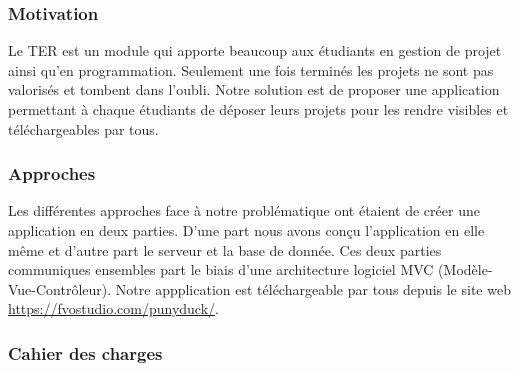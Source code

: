 \documentclass{report}
\begin{document}
\subsubsection{\huge{Motivation}}

Le TER est un module qui apporte beaucoup aux étudiants en gestion de projet ainsi qu'en programmation. Seulement une fois terminés les projets ne sont pas valorisés et tombent dans l'oubli. Notre solution est de proposer une application permettant à chaque étudiants de déposer leurs projets pour les rendre visibles et téléchargeables par tous.

\subsubsection{\huge{Approches}}
Les différentes approches face à notre problématique ont étaient de créer une application en deux parties. D'une part nous avons conçu l'application en elle même et d'autre part le serveur et la base de donnée. Ces deux parties communiques ensembles part le biais d'une architecture logiciel MVC (Modèle-Vue-Contrôleur).
Notre appplication est téléchargeable par tous depuis le site web \url{ https://fvostudio.com/punyduck/}.

\subsubsection{\huge{Cahier des charges}}
\end{document}
